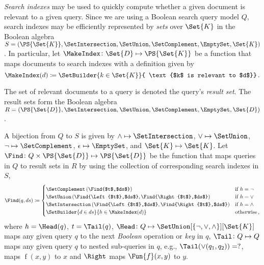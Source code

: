\documentclass[ ../main.tex]{subfiles}
\begin{document}
\emph{Search indexes} may be used to quickly compute whether a given document is relevant to a given query.
Since we are using a Boolean search query model $Q$, search indexes may be efficiently represented  by \emph{sets} over $\Set{K}$ in the Boolean algebra $S = (\PS{\Set{K}}, \SetIntersection, \SetUnion, \SetComplement, \EmptySet, \Set{K})$.
In particular, let $\MakeIndex \colon \Set{D} \mapsto \PS{\Set{K}}$ be a function that maps documents to search indexes with a definition given by
\begin{equation}
	\MakeIndex(d) \coloneqq \SetBuilder{k \in \Set{K}}{	\text{$k$ is relevant to $d$}}\,.
\end{equation}

The set of relevant documents to a query is denoted the query's \emph{result set}.
The result sets form the Boolean algebra $R = (\PS{\Set{D}}, \SetIntersection, \SetUnion, \SetComplement, \EmptySet, \Set{D})$.

A bijection from $Q$ to $S$ is given by $\land \mapsto \SetIntersection$, $\lor \mapsto \SetUnion$, $\neg \mapsto \SetComplement$, $\epsilon \mapsto \EmptySet$, and $\Set{K} \mapsto \Set{K}$.
Let $\Find \colon Q \times \PS{\Set{D}} \mapsto \PS{\Set{D}}$ be the function that maps queries in $Q$ to result sets in $R$ by using the collection of corresponding search indexes in $S$,
\begin{equation}
\Find(q,ds) \coloneqq
\begin{cases}
	\SetComplement\left(\Find{$t$,$ds$}\right) & \text{if $h = \neg$} \\
	\SetUnion
		\left(
			\Find{\Left{$t$},$ds$},
			\Find{\Right{$t$},$ds$}
		\right) & \text{if $h = \lor$} \\
	\SetIntersection
		\left(
			\Find{\Left{$t$},$ds$},
			\Find{\Right{$t$},$ds$}
		\right) & \text{if $h = \land$} \\
	\SetBuilder{d \in ds}{h \in \MakeIndex(d)} & \text{otherwise}\,,
\end{cases}	
\end{equation}
where $h = \Head(q)$, $t = \Tail(q)$, $\Head \colon Q \mapsto \SetUnion[\{\neg,\lor,\land\}][\Set{K}]$ maps any given query $q$ to the next \emph{Boolean} operation or \emph{key} in $q$, $\Tail \colon Q \mapsto Q$ maps any given query $q$ to nested sub-queries in $q$, e.g., $\Tail(\lor(q_1,q_2)) = ?$, \Left maps $\operatorname{f}(x,y)$ to $x$ and $\Right$ maps $\Fun{f}(x,y)$ to $y$.

%
\end{document}
